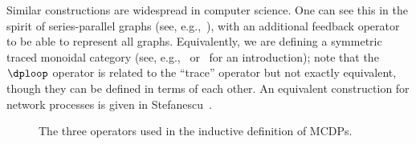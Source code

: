 Similar constructions are widespread in computer science. One can
see this in the spirit of series-parallel graphs (see, e.g.,~\cite{duffin65topology}),
with an additional feedback operator to be able to represent all graphs.
Equivalently, we are defining a symmetric traced monoidal category
(see, e.g.,~\cite{joyal96traced} or~\cite{spivak14category} for
an introduction); note that the~$\dploop$ operator is related to
the ``trace'' operator but not exactly equivalent, though they can
be defined in terms of each other. An equivalent construction for
network processes is given in Stefanescu~\cite{stefanescu00}.

\begin{figure}[h]
    \centering{}\hfill{}\hfill{}\hfill{}\smallskip{}
    \caption{\label{fig:series-par-loop}The three operators used in the inductive
    definition of MCDPs.}
\end{figure}

